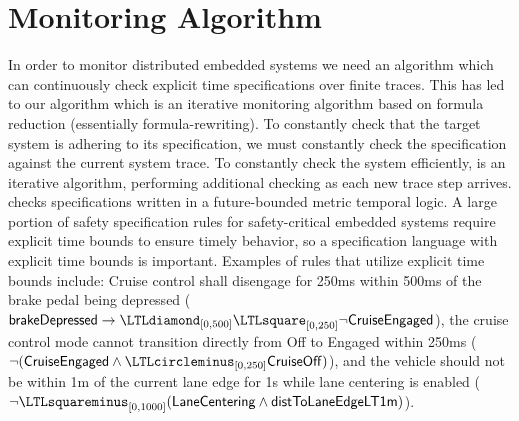 
\section{Monitoring Algorithm}

In order to monitor distributed embedded systems we need an algorithm which can continuously check explicit time specifications over finite traces. This has led to our algorithm \monitor which is an iterative monitoring algorithm based on formula reduction (essentially formula-rewriting). 
%
To constantly check that the target system is adhering to its specification, we must constantly check the specification against the current system trace. To constantly check the system efficiently, \monitor is an iterative algorithm, performing additional checking as each new trace step arrives.
%
\monitor checks specifications written in a future-bounded metric temporal logic. A large portion of safety specification rules for safety-critical embedded systems require explicit time bounds to ensure timely behavior, so a specification language with explicit time bounds is important. 
%
Examples of rules that utilize explicit time bounds include: %
Cruise control shall disengage for 250ms within 500ms of the brake pedal being depressed ($\pred{brakeDepressed} \rightarrow \eventually_{[0, 500]} \henceforth_{[0,250]} \neg \pred{CruiseEngaged}$), 
the cruise control mode cannot transition directly from Off to Engaged within 250ms ($\neg (\pred{CruiseEngaged} \wedge \yesterday_{[0,250]} \pred{CruiseOff})$), 
and the vehicle should not be within 1m of the current lane edge for 1s while lane centering is enabled ($\neg \historically_{[0, 1000]}(\pred{LaneCentering} \wedge \pred{distToLaneEdgeLT1m})$).



